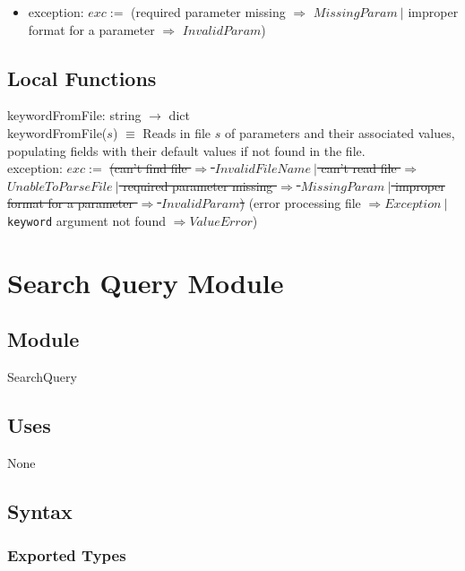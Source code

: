 \documentclass{article}
\begin{document}
\begin{itemize}
\color{black}

\item exception: $\mathit{exc} :=$ (required parameter missing $\Rightarrow$ $\mathit{MissingParam} ~\vert$ improper format for a parameter $\Rightarrow$ $\mathit{InvalidParam}$)
\end{itemize}

\subsection* {Local Functions}

keywordFromFile: string $\rightarrow$ dict \\
keywordFromFile($\mathit{s}$) $\equiv$ Reads in file $\mathit{s}$ of parameters and their associated values\color{red}, populating fields with their default values if not found in the file\color{black}.\\
exception: $exc :=$ \st{(can't find file $\Rightarrow$ $\mathit{InvalidFileName} ~\vert$ can't read file $\Rightarrow$ $\mathit{UnableToParseFile} ~\vert$ required parameter missing $\Rightarrow$ $\mathit{MissingParam}~\vert$ improper format for a parameter $\Rightarrow$ $\mathit{InvalidParam}$)} \color{red}(error processing file $\Rightarrow \mathit{Exception} ~\vert$ \texttt{keyword} argument not found $\Rightarrow \mathit{ValueError}$)\color{black}

\newpage

\section*{Search Query Module}

\subsection* {Module}

SearchQuery

\subsection* {Uses}

None

\subsection* {Syntax}

\subsubsection* {Exported Types}
\end{document}
